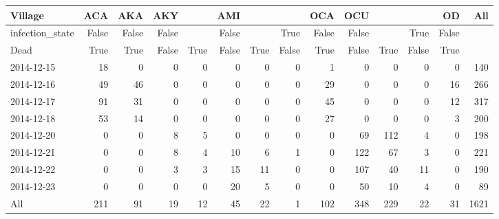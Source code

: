 \documentclass[letterpaper]{scrartcl}
\begin{document}
\begin{longtable}[c]{@{}lrrrrrrrrrrrrr@{}}
\toprule
Village & ACA & AKA & AKY & & AMI & & & OCA & OCU & & & OD &
All\tabularnewline
\midrule
\endhead
infection\_state & False & False & False & & False & & True & False &
False & & True & False &\tabularnewline
Dead & True & True & False & True & False & True & False & True & False
& True & False & True &\tabularnewline
2014-12-15 & 18 & 0 & 0 & 0 & 0 & 0 & 0 & 1 & 0 & 0 & 0 & 0 &
140\tabularnewline
2014-12-16 & 49 & 46 & 0 & 0 & 0 & 0 & 0 & 29 & 0 & 0 & 0 & 16 &
266\tabularnewline
2014-12-17 & 91 & 31 & 0 & 0 & 0 & 0 & 0 & 45 & 0 & 0 & 0 & 12 &
317\tabularnewline
2014-12-18 & 53 & 14 & 0 & 0 & 0 & 0 & 0 & 27 & 0 & 0 & 0 & 3 &
200\tabularnewline
2014-12-20 & 0 & 0 & 8 & 5 & 0 & 0 & 0 & 0 & 69 & 112 & 4 & 0 &
198\tabularnewline
2014-12-21 & 0 & 0 & 8 & 4 & 10 & 6 & 1 & 0 & 122 & 67 & 3 & 0 &
221\tabularnewline
2014-12-22 & 0 & 0 & 3 & 3 & 15 & 11 & 0 & 0 & 107 & 40 & 11 & 0 &
190\tabularnewline
2014-12-23 & 0 & 0 & 0 & 0 & 20 & 5 & 0 & 0 & 50 & 10 & 4 & 0 &
89\tabularnewline
All & 211 & 91 & 19 & 12 & 45 & 22 & 1 & 102 & 348 & 229 & 22 & 31 &
1621\tabularnewline
\bottomrule
\end{longtable}
\end{document}
